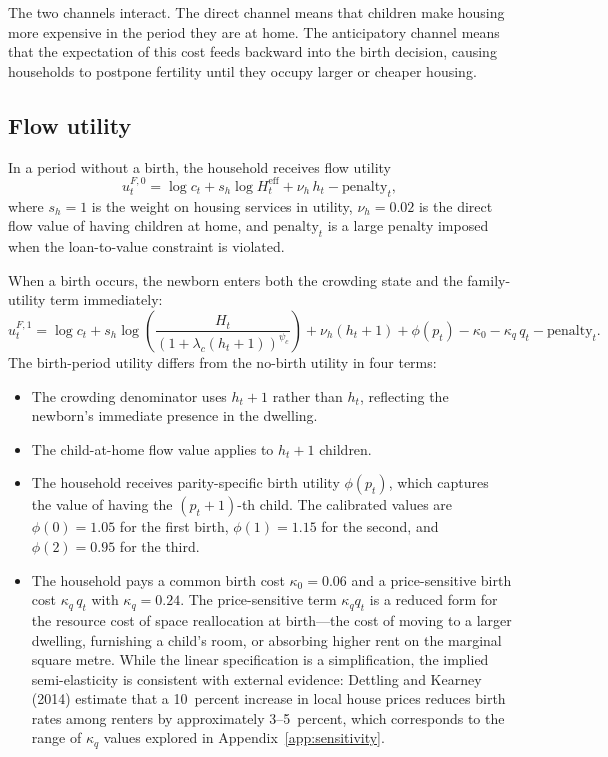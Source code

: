 The two channels interact. The direct channel means that children make housing more expensive in the period they are at home. The anticipatory channel means that the expectation of this cost feeds backward into the birth decision, causing households to postpone fertility until they occupy larger or cheaper housing.

\subsection{Flow utility}

In a period without a birth, the household receives flow utility
\begin{equation}\label{eq:flow_nobirth}
u_t^{F,0} = \log c_t + s_h \log H_t^{\text{eff}} + \nu_h \, h_t - \text{penalty}_t,
\end{equation}
where $s_h = 1$ is the weight on housing services in utility, $\nu_h = 0.02$ is the direct flow value of having children at home, and $\text{penalty}_t$ is a large penalty imposed when the loan-to-value constraint is violated.

When a birth occurs, the newborn enters both the crowding state and the family-utility term immediately:
\begin{equation}\label{eq:flow_birth}
u_t^{F,1} = \log c_t + s_h \log\!\left(\frac{H_t}{(1 + \lambda_c(h_t + 1))^{\psi_c}}\right) + \nu_h (h_t + 1) + \phi(p_t) - \kappa_0 - \kappa_q \, q_t - \text{penalty}_t.
\end{equation}
The birth-period utility differs from the no-birth utility in four terms:
\begin{itemize}
\item The crowding denominator uses $h_t + 1$ rather than $h_t$, reflecting the newborn's immediate presence in the dwelling.
\item The child-at-home flow value applies to $h_t + 1$ children.
\item The household receives parity-specific birth utility $\phi(p_t)$, which captures the value of having the $(p_t + 1)$-th child. The calibrated values are $\phi(0) = 1.05$ for the first birth, $\phi(1) = 1.15$ for the second, and $\phi(2) = 0.95$ for the third.
\item The household pays a common birth cost $\kappa_0 = 0.06$ and a price-sensitive birth cost $\kappa_q \, q_t$ with $\kappa_q = 0.24$. The price-sensitive term $\kappa_q q_t$ is a reduced form for the resource cost of space reallocation at birth---the cost of moving to a larger dwelling, furnishing a child's room, or absorbing higher rent on the marginal square metre. While the linear specification is a simplification, the implied semi-elasticity is consistent with external evidence: Dettling and Kearney (2014) estimate that a 10~percent increase in local house prices reduces birth rates among renters by approximately 3--5~percent, which corresponds to the range of $\kappa_q$ values explored in Appendix~\ref{app:sensitivity}.
\end{itemize}

